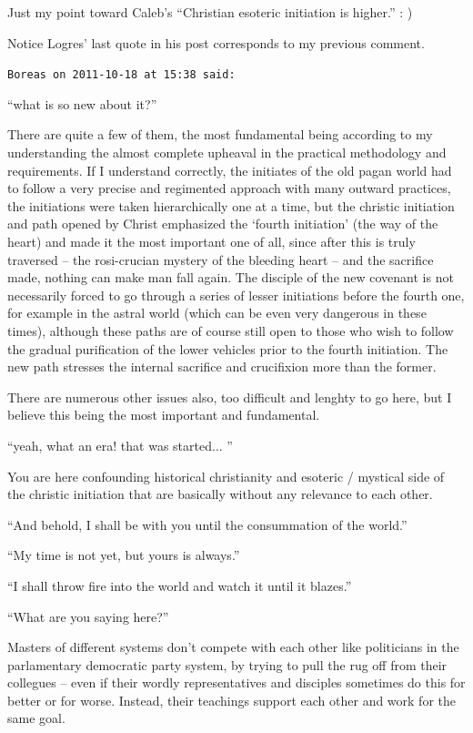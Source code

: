 \begin{footnotesize}
\begin{sffamily}
Just my point toward Caleb's ``Christian esoteric initiation is higher.'' : )

Notice Logres' last quote in his post corresponds to my previous comment.

\hfill

\texttt{Boreas on 2011-10-18 at 15:38 said:}

``what is so new about it?''

There are quite a few of them, the most fundamental being according to my understanding the almost complete upheaval in the practical methodology and requirements. If I understand correctly, the initiates of the old pagan world had to follow a very precise and regimented approach with many outward practices, the initiations were taken hierarchically one at a time, but the christic initiation and path opened by Christ emphasized the `fourth initiation' (the way of the heart) and made it the most important one of all, since after this is truly traversed -- the rosi-crucian mystery of the bleeding heart -- and the sacrifice made, nothing can make man fall again. The disciple of the new covenant is not necessarily forced to go through a series of lesser initiations before the fourth one, for example in the astral world (which can be even very dangerous in these times), although these paths are of course still open to those who wish to follow the gradual purification of the lower vehicles prior to the fourth initiation. The new path stresses the internal sacrifice and crucifixion more than the former.

There are numerous other issues also, too difficult and lenghty to go here, but I believe this being the most important and fundamental.

``yeah, what an era! that was started... ''

You are here confounding historical christianity and esoteric / mystical side of the christic initiation that are basically without any relevance to each other.

``And behold, I shall be with you until the consummation of the world.''

``My time is not yet, but yours is always.''

``I shall throw fire into the world and watch it until it blazes.''

``What are you saying here?''

Masters of different systems don't compete with each other like politicians in the parlamentary democratic party system, by trying to pull the rug off from their collegues -- even if their wordly representatives and disciples sometimes do this for better or for worse. Instead, their teachings support each other and work for the same goal.


\hfill

\end{sffamily}
\end{footnotesize}

